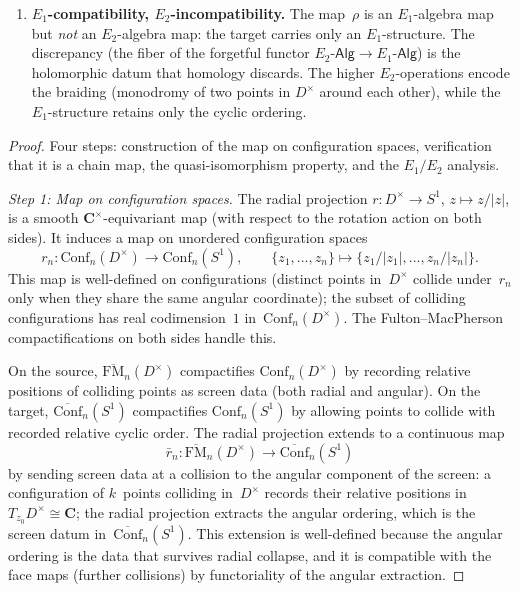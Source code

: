 \begin{proposition}
\begin{enumerate}[label=\textup{(\roman*)}]
\item \textbf{$E_1$-compatibility, $E_2$-incompatibility.}
 The map~$\rho$ is an $E_1$-algebra map but \emph{not}
 an $E_2$-algebra map: the target carries only an
 $E_1$-structure.
 The discrepancy (the fiber of the forgetful functor
 $E_2\text{-}\mathsf{Alg}\to E_1\text{-}\mathsf{Alg}$) is
 the holomorphic datum that homology discards.
 The higher $E_2$-operations encode the braiding
 (monodromy of two points in $D^\times$ around each
 other), while the $E_1$-structure retains only the
 cyclic ordering.
\end{enumerate}
\end{proposition}

\begin{proof}
Four steps: construction of the map on configuration spaces,
verification that it is a chain map, the quasi-isomorphism property,
and the $E_1/E_2$ analysis.

\medskip
\noindent\textit{Step 1: Map on configuration spaces.}
The radial projection $r\colon D^\times\to S^1$,
$z\mapsto z/|z|$, is a smooth $\mathbf{C}^\times$-equivariant
map (with respect to the rotation action on both sides).
It induces a map on unordered configuration spaces
\begin{equation}\label{eq:config-retract}
 r_n\colon \mathrm{Conf}_n(D^\times)
 \longrightarrow \mathrm{Conf}_n(S^1),
 \qquad
 \{z_1,\dots,z_n\}\longmapsto
 \bigl\{z_1/|z_1|,\dots,z_n/|z_n|\bigr\}.
\end{equation}
This map is well-defined on configurations (distinct
points in~$D^\times$ collide under~$r_n$ only when
they share the same angular coordinate); the
subset of colliding configurations has real
codimension~$1$ in~$\mathrm{Conf}_n(D^\times)$.
The Fulton--MacPherson compactifications on both sides handle this.

On the source, $\overline{\mathrm{FM}}_n(D^\times)$
compactifies $\mathrm{Conf}_n(D^\times)$ by recording
relative positions of colliding points as
screen data (both radial and angular).
On the target, $\overline{\mathrm{Conf}}_n(S^1)$
compactifies $\mathrm{Conf}_n(S^1)$ by allowing
points to collide with recorded relative cyclic order.
The radial projection extends to a continuous map
\begin{equation}\label{eq:FM-retract}
 \bar r_n\colon
 \overline{\mathrm{FM}}_n(D^\times)
 \longrightarrow
 \overline{\mathrm{Conf}}_n(S^1)
\end{equation}
by sending screen data at a collision to the angular
component of the screen: a configuration of $k$~points
colliding in~$D^\times$ records their relative positions
in~$T_{z_0}D^\times\cong\mathbf{C}$; the radial
projection extracts the angular ordering, which is
the screen datum in~$\overline{\mathrm{Conf}}_n(S^1)$.
This extension is well-defined because the angular
ordering is the data that survives radial collapse,
and it is compatible with the face maps (further
collisions) by functoriality of the angular extraction.


\end{proof}

